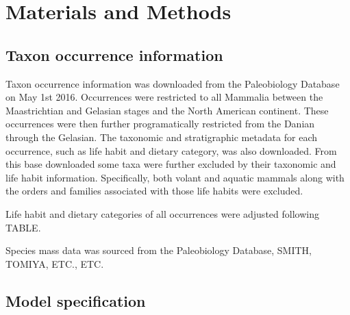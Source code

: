 \documentclass[12pt,letterpaper]{article}
\begin{document}
\section*{Materials and Methods}

\subsection*{Taxon occurrence information}


Taxon occurrence information was downloaded from the Paleobiology Database on May 1st 2016. Occurrences were restricted to all Mammalia between the Maastrichtian and Gelasian stages and  the North American continent. These occurrences were then further programatically restricted from the Danian through the Gelasian. The taxonomic and stratigraphic metadata for each occurrence, such as life habit and dietary category, was also downloaded. From this base downloaded some taxa were further excluded by their taxonomic and life habit information. Specifically, both volant and aquatic mammals along with the orders and families associated with those life habits were excluded. 


Life habit and dietary categories of all occurrences were adjusted following TABLE. 

Species mass data was sourced from the Paleobiology Database, SMITH, TOMIYA, ETC., ETC.




\subsection*{Model specification}

\end{document}
